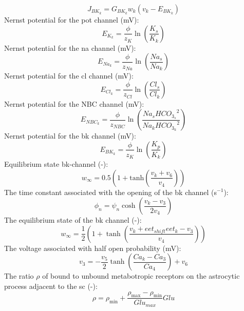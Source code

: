 \documentclass[11pt]{elsarticle}
\newcommand{\psec}{s$^{-1}$\xspace}
\newcommand{\na}{\gls{na}\xspace}
\newcommand{\pot}{\gls{pot}\xspace}
\newcommand{\cl}{\gls{cl}\xspace}
\begin{document}
\begin{equation} \label{eq:J_BK}
J_{BK_k}= G_{BK_k}w_k\left( v_k-E_{BK_k} \right)
\end{equation}
%
Nernst potential for the \pot channel (mV):
\begin{equation} \label{eq:E_K}
E_{K_k}=\frac{\phi}{z_K}\ln\left( \frac{K_s}{K_k}\right) 
\end{equation}
%
Nernst potential for the \na channel (mV):
\begin{equation} \label{eq:E_Na}
E_{Na_k}=\frac{\phi}{z_{Na}}\ln\left( \frac{Na_s}{Na_k}\right) 
\end{equation}
%
Nernst potential for the \cl channel (mV):
\begin{equation} \label{eq:E_Cl}
E_{Cl_k}=\frac{\phi}{z_{Cl}}\ln\left( \frac{Cl_s}{Cl_k}\right) 
\end{equation}
%
Nernst potential for the NBC channel (mV):
\begin{equation} \label{eq:E_NBC}
E_{NBC_k}=\frac{\phi}{z_{NBC}}\ln\left( \frac{Na_s {HCO_{3_s}}^2}{Na_k {HCO_{3_k}}^2}\right) 
\end{equation}
Nernst potential for the \gls{bk} channel (mV):
\begin{equation} \label{eq:E_BK}
E_{BK_k}=\frac{\phi}{z_K}\ln\left( \frac{K_p}{K_k}\right) 
\end{equation}
%
Equilibrium state \gls{bk}-channel (-):
\begin{equation} \label{eq:winf}
w_{\infty}=0.5 \left(1+\mathrm{tanh}\left(\frac{v_{k}+v_{6} }{v_{4}} \right)  \right) 
\end{equation}
%
The time constant associated with the opening of the \gls{bk} channel (\psec):
\begin{equation}
\phi_n = \psi_n \cosh \left( \frac{v_k - v_3}{2 v_4} \right)
\end{equation}
%
The equilibrium state of the \gls{bk} channel (-):
\begin{equation}
w_{\infty} = \frac{1}{2} \left( 1 + \tanh \left( \frac{v_k + eet_{shift} eet_k - v_3}{v_4}  \right)  \right)
\end{equation}
%
The voltage associated with half open probability (mV):
\begin{equation}
v_3 = - \frac{v_5}{2} \tanh \left(  \frac{Ca_k - Ca_3}{Ca_4}  \right) + v_6
\end{equation}
%
The ratio $\rho$ of bound to unbound metabotropic receptors on the astrocytic process adjacent to the \gls{sc} (-):
\begin{equation}
\rho = \rho_{\text{min}} + \frac{\rho_{\text{max}} - \rho_{\text{min}}}{Glu_{max}}
Glu
\end{equation}
\end{document}
